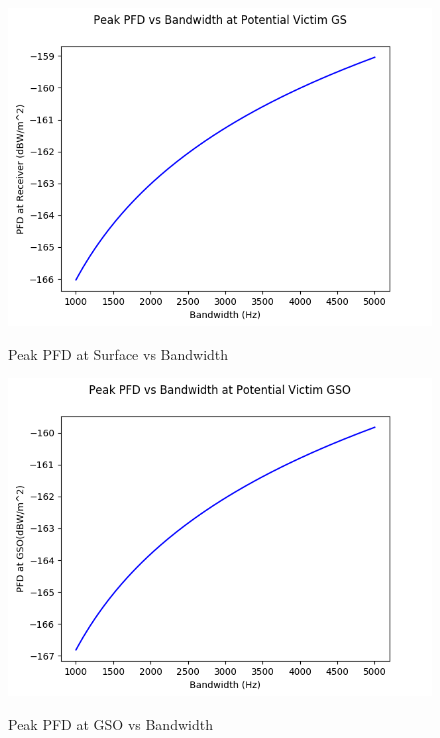 \documentclass{article}
\begin{document}
\begin{center}
  \begin{figure}
    \caption{Peak PFD at Surface vs Bandwidth}
    \includegraphics[width=\linewidth]{./pfd-rx_1000-5000.png}
    \label{fig::pfd::rx_1000-5000}
  \end{figure}
        

  \begin{figure}
    \caption{Peak PFD at GSO vs Bandwidth}
    \includegraphics[width=\linewidth]{./pfd-gso_1000-5000.png}
    \label{fig::pfd::gso_1000-5000}
  \end{figure}
        
\end{center}


\newpage
\end{document}

